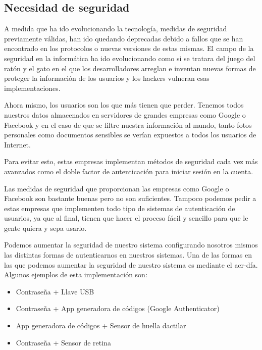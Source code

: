 \documentclass[titlepage, 12pt, a4paper]{article}
\begin{document}
\subsection{Necesidad de seguridad}
A medida que ha ido evolucionando la tecnología, medidas de seguridad previamente válidas, han ido quedando deprecadas debido a fallos que se han encontrado en los protocolos o nuevas versiones de estas mismas. El campo de la seguridad en la informática ha ido evolucionando como si se tratara del juego del ratón y el gato en el que los desarrolladores arreglan e inventan nuevas formas de proteger la información de los usuarios y los hackers vulneran esas implementaciones.\par Ahora mismo, los usuarios son los que más tienen que perder. Tenemos todos nuestros datos almacenados en servidores de grandes empresas como Google o Facebook y en el caso de que se filtre nuestra información al mundo, tanto fotos personales como documentos sensibles se verían expuestos a todos los usuarios de Internet.\par Para evitar esto, estas empresas implementan métodos de seguridad cada vez más avanzados como el doble factor de autenticación para iniciar sesión en la cuenta.\par Las medidas de seguridad que proporcionan las empresas como Google o Facebook son bastante buenas pero no son suficientes. Tampoco podemos pedir a estas empresas que implementen todo tipo de sistemas de autenticación de usuarios, ya que al final, tienen que hacer el proceso fácil y sencillo para que le gente quiera y sepa usarlo.\par Podemos aumentar la seguridad de nuestro sistema configurando nosotros mismos las distintas formas de autenticarnos en nuestros sistemas. Una de las formas en las que podemos aumentar la seguridad de nuestro sistema es mediante el \gls{acr-dfa}. Algunos ejemplos de esta implementación son:
\begin{itemize}
	\item Contraseña + Llave USB
	\item Contraseña + App generadora de códigos (Google Authenticator)
	\item App generadora de códigos + Sensor de huella dactilar
	\item Contraseña + Sensor de retina
\end{itemize}
\end{document}
